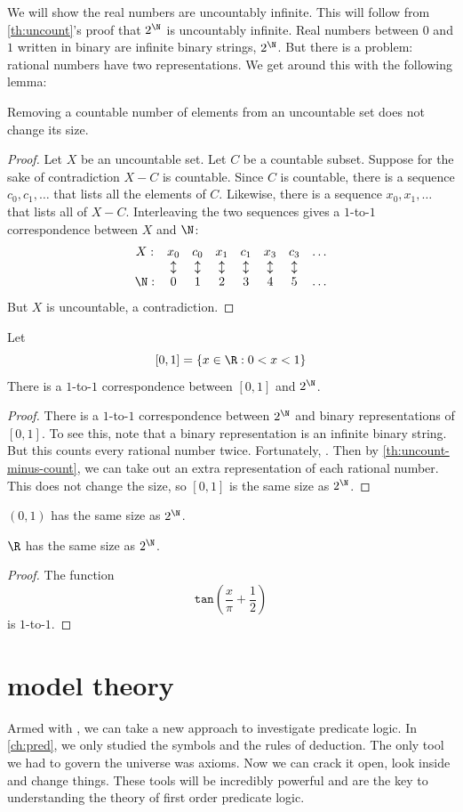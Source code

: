 \documentclass{scrbook}
\renewcommand{\tan}{\texttt{tan}}
\begin{document}
We will show the real numbers are uncountably infinite. This will follow from \cref{th:uncount}'s proof that $2^\N$ is uncountably infinite. Real numbers between $0$ and $1$ written in binary are infinite binary strings, $2^\N$. But there is a problem: rational numbers have two representations. We get around this with the following lemma:

\begin{lemma}\label{th:uncount-minus-count}
  Removing a countable number of elements from an uncountable set does not change its size. 
\end{lemma}
\begin{proof}
  Let $X$ be an uncountable set. Let $C$ be a countable subset. Suppose for the sake of contradiction $X-C$ is countable. Since $C$ is countable, there is a sequence $c_0,c_1,\dots$ that lists all the elements of $C$. Likewise, there is a sequence $x_0,x_1,\dots$ that lists all of $X-C$. Interleaving the two sequences gives a $1$-to-$1$ correspondence between $X$ and $\N$:
  \[
  \begin{matrix}
    X:  & x_0 & c_0 & x_1 & c_1 & x_3 & c_3 & \dots \\
    {}  & \updownarrow &\updownarrow &\updownarrow &\updownarrow &\updownarrow &\updownarrow & \\
    \N: & 0 & 1 & 2 & 3 & 4 & 5 &\dots
  \end{matrix}
  \]
  But $X$ is uncountable, a contradiction. 
\end{proof}

\begin{theorem}
  Let
  \[
  [0,1]=\{x\in\R:0<x<1\}
  \]
  There is a $1$-to-$1$ correspondence between $[0,1]$ and $2^\N$.
\end{theorem}
\begin{proof}
  There is a $1$-to-$1$ correspondence between $2^\N$ and binary representations of $[0,1]$. To see this, note that a binary representation is an infinite binary string. But this counts every rational number twice. Fortunately, . Then by \cref{th:uncount-minus-count}, we can take out an extra representation of each rational number. This does not change the size, so $[0,1]$ is the same size as $2^\N$. 
\end{proof}
\begin{cor}
  $(0,1)$ has the same size as $2^\N$. 
\end{cor}
\begin{cor}
  $\R$ has the same size as $2^\N$. 
\end{cor}
\begin{proof}
  The function
  \[
  \tan\left(\frac x\pi +\frac 12\right)
  \]
  is $1$-to-$1$. 
\end{proof}
\chapter[Model theory]{model theory}
Armed with \zfc, we can take a new approach to investigate predicate logic. In \cref{ch:pred}, we only studied the symbols and the rules of deduction. The only tool we had to govern the universe was axioms. Now we can crack it open, look inside and change things. These tools will be incredibly powerful and are the key to understanding the theory of first order predicate logic. 
\printbibliography
\end{document}
